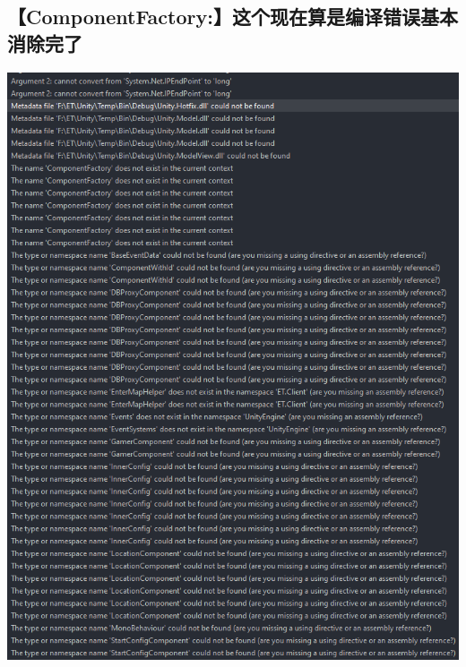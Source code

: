 \documentclass[9pt, b5paper]{article}
\begin{document}
\subsection{【ComponentFactory:】这个现在算是编译错误基本消除完了}
\label{sec-7-2}

\includegraphics[width=.9\linewidth]{./pic/et4_20230623_152737.png}
\end{document}
